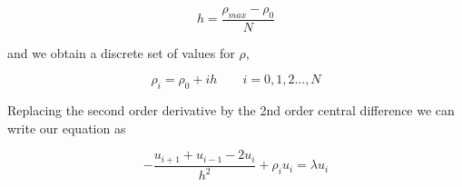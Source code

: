 \documentclass[%
 reprint,
 nobalancelastpage,
 amsmath,amssymb,
 aps,
]{revtex4-1}
\begin{document}
\begin{equation}
	h = \frac{\rho_{max}-\rho_{0}}{N}
\end{equation}

and we obtain a discrete set of values for $\rho$, 

\begin{equation}
	\rho_{i} = \rho_{0} + ih \qquad i=0,1,2...,N
\end{equation}

Replacing the second order derivative by the 2nd order central difference we can write our equation as 

\begin{equation}
	-\frac{u_{i+1}+u_{i-1}-2u_{i}}{h^{2}} + \rho_{i}u_{i} = \lambda u_{i}
\end{equation}




\end{document}
